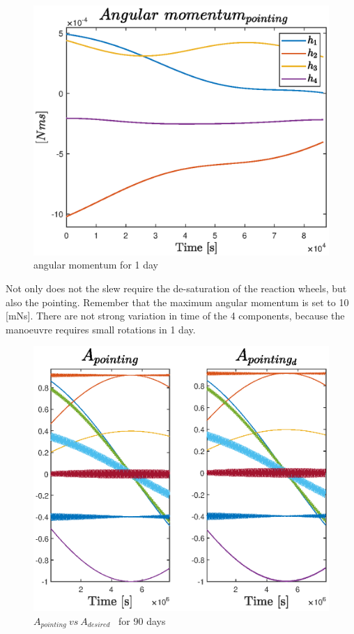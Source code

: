 \documentclass[11pt]{article}
\begin{document}
\begin{minipage}{.5 \textwidth}
\begin{figure} [H]
\centering 
\includegraphics[scale= 0.5]{ang_mom_pointing.eps}
\caption{angular momentum for 1 day}
\end{figure}
\end{minipage}
\begin{minipage}{.5 \textwidth}
Not only does not the slew require the de-saturation of the reaction wheels, but also the pointing. Remember that the maximum angular momentum is set to 10 [mNs]. There are not strong variation in time of the 4 components, because the manoeuvre requires small rotations in 1 day.
\end{minipage}
\begin{minipage}{.5 \textwidth}
\begin{figure} [H]
\centering 
\includegraphics[scale= 0.65]{A_365.eps}
\caption{ $A_{pointing} \ vs \ A_{desired}$ \ for 90 days}
\end{figure}
\end{minipage}
\end{document}
